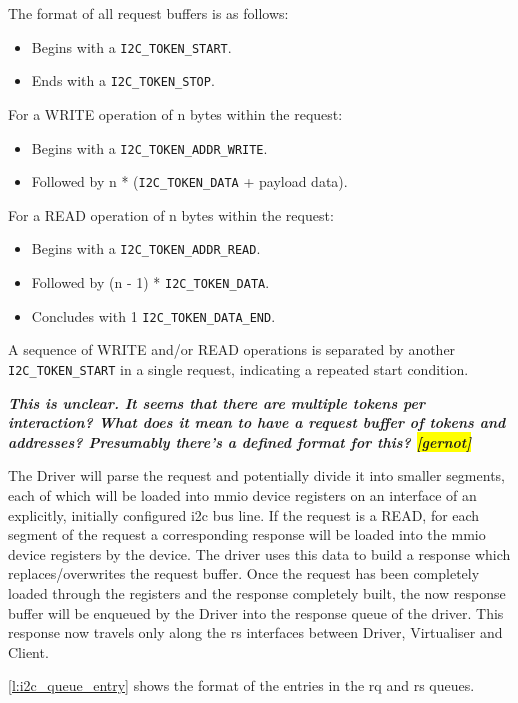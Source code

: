 \documentclass[a4paper,12pt]{report}
\newcommand{\Comment}[1]{\textbf{\textsl{#1}}}
\newcommand{\Comment}[1]{\relax}
\newcommand{\gernot}[1]{\Comment{#1 \colorbox{yellow}{[gernot]}}}
\newcommand{\code}[1]{\texttt{#1}}
\begin{document}
The format of all request buffers is as follows:
\begin{itemize}
  \item Begins with a \code{I2C\_TOKEN\_START}.
  \item Ends with a \code{I2C\_TOKEN\_STOP}.
\end{itemize}

For a WRITE operation of n bytes within the request:
\begin{itemize}
  \item Begins with a \code{I2C\_TOKEN\_ADDR\_WRITE}.
  \item Followed by n * (\code{I2C\_TOKEN\_DATA} + payload data).
\end{itemize}

For a READ operation of n bytes within the request:
\begin{itemize}
  \item Begins with a \code{I2C\_TOKEN\_ADDR\_READ}.
  \item Followed by (n - 1) * \code{I2C\_TOKEN\_DATA}.
  \item Concludes with 1 \code{I2C\_TOKEN\_DATA\_END}.
\end{itemize}

A sequence of WRITE and/or READ operations is separated by another \code{I2C\_TOKEN\_START}
in a single request, indicating a repeated start condition.

\gernot{This is unclear. It seems that there are multiple tokens per
  interaction? What does it mean to have a request buffer of tokens
  and addresses? Presumably there's a defined format for this?}

The Driver will parse the request and potentially divide it into smaller segments,
each of which will be loaded into \gls{mmio} device registers
on an interface of an explicitly, initially configured \gls{i2c} bus line.
If the request is a READ, for each segment of the request a corresponding response
will be loaded into the \gls{mmio} device registers by the device.
The driver uses this data to build a response which replaces/overwrites the request buffer.
Once the request has been completely loaded through the registers and the response completely built,
the now response buffer will be enqueued by the Driver into the response queue of the driver.
This response now travels only along the \gls{rs} interfaces between Driver, Virtualiser and Client.

\autoref{l:i2c_queue_entry} shows the format of the entries in the \gls{rq}
and \gls{rs} queues.
\end{document}
